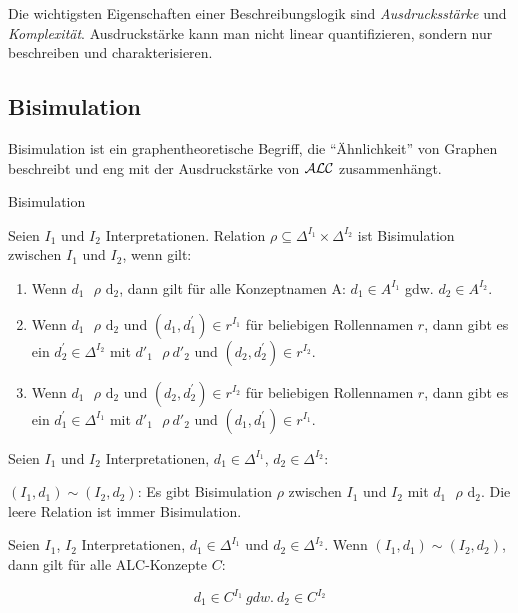 Die wichtigsten Eigenschaften einer Beschreibungslogik sind
\emph{Ausdrucksstärke} und \emph{Komplexität}. Ausdruckstärke kann man
nicht linear quantifizieren, sondern nur beschreiben und
charakterisieren.

\subsection{Bisimulation}\label{bisimulation}

Bisimulation ist ein graphentheoretische Begriff, die ``Ähnlichkeit'' von Graphen beschreibt und eng mit der Ausdruckstärke von $\mathcal{A}\mathcal{L}\mathcal{C}$ zusammenhängt.

\begin{definition}{Bisimulation}

Seien $I_{1}$ und $I_{2}$ Interpretationen. Relation
$\rho \subseteq \Delta^{I_{1}} \times \Delta^{I_{2}}$ ist Bisimulation
zwischen $I_{1}$ und $I_{2}$, wenn gilt:

\begin{enumerate}
\def\labelenumi{\arabic{enumi}.}
\item
  Wenn $d_{1}\text{\ $\rho$}\text{\ d}_{2}$, dann gilt für alle
  Konzeptnamen A: $d_{1} \in A^{I_{1}}$ gdw. $d_{2} \in A^{I_{2}}$.
\item
  Wenn $d_{1}\text{\ $\rho$}\text{\ d}_{2}$ und
  $\left( d_{1},d_{1}^{'} \right) \in r^{I_{1}}$ für beliebigen
  Rollennamen $r$, dann gibt es ein $d_{2}^{'} \in \Delta^{I_{2}}$
  mit ${d'}_{1}\text{\ $\rho$}{\ d'}_{2}$ und
  $\left( d_{2},d_{2}^{'} \right) \in r^{I_{2}}$.
\item
  Wenn $d_{1}\text{\ $\rho$}\text{\ d}_{2}$ und
  $\left( d_{2},d_{2}^{'} \right) \in r^{I_{2}}$ für beliebigen
  Rollennamen $r$, dann gibt es ein $d_{1}^{'} \in \Delta^{I_{1}}$
  mit ${d'}_{1}\text{\ $\rho$}{\ d'}_{2}$ und
  $\left( d_{1},d_{1}^{'} \right) \in r^{I_{1}}$.
\end{enumerate}
\end{definition}

Seien $I_{1}$ und $I_{2}$ Interpretationen,
$d_{1} \in \Delta^{I_{1}}$, $d_{2} \in \Delta^{I_{2}}$:

$(I_{1},d_{1}) \sim (I_{2},d_{2})$: Es gibt Bisimulation $\rho$
zwischen $I_{1}$ und $I_{2}$ mit $d_{1}\text{\ $\rho$}\text{\ d}_{2}$.
Die leere Relation ist immer Bisimulation.

\begin{theorem}
Seien $I_{1}$, $I_{2}$ Interpretationen,
$d_{1} \in \Delta^{I_{1}}$ und $d_{2} \in \Delta^{I_{2}}$. Wenn
$(I_{1},d_{1}) \sim (I_{2},d_{2})$, dann gilt für alle ALC-Konzepte
$C$:

$$d_{1} \in C^{I_{1}}\ gdw.\ d_{2} \in C^{I_{2}}$$
\end{theorem}

